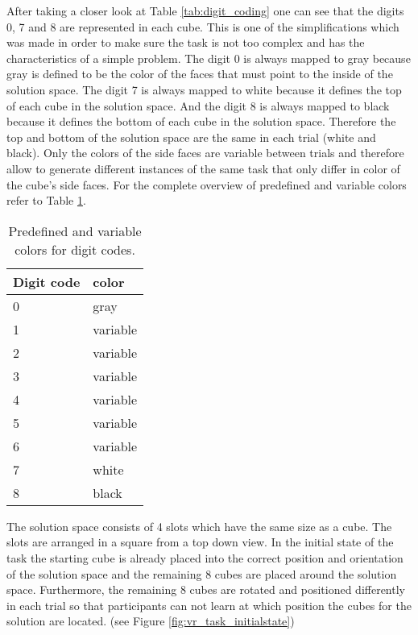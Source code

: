 After taking a closer look at Table \ref{tab:digit_coding} one can see that the digits 0, 7 and 8 are represented in each cube. This is one of the simplifications which was made in order to make sure the task is not too complex and has the characteristics of a simple problem. The digit 0 is always mapped to gray because gray is defined to be the color of the faces that must point to the inside of the solution space. The digit 7 is always mapped to white because it defines the top of each cube in the solution space. And the digit 8 is always mapped to black because it defines the bottom of each cube in the solution space. Therefore the top and bottom of the solution space are the same in each trial (white and black). Only the colors of the side faces are variable between trials and therefore allow to generate different instances of the same task that only differ in color of the cube's side faces. For the complete overview of predefined and variable colors refer to Table \ref{tab:color_mapping}.

\begin{table}
\begin{center}
    \begin{tabular}{| l | l |}
    \hline
    \textbf{Digit code} & \textbf{color} \\ \hline
    0 & gray \\ \hline
    1 & variable \\ \hline
    2 & variable \\ \hline
    3 & variable \\ \hline
    4 & variable \\ \hline
    5 & variable \\ \hline
    6 & variable \\ \hline
    7 & white \\ \hline
    8 & black \\ \hline
    \end{tabular}
\end{center}
\caption{Predefined and variable colors for digit codes.}
\label{tab:color_mapping}
\end{table}

The solution space consists of 4 slots which have the same size as a cube. The slots are arranged in a square from a top down view. In the initial state of the task the starting cube is already placed into the correct position and orientation of the solution space and the remaining 8 cubes are placed around the solution space. Furthermore, the remaining 8 cubes are rotated and positioned differently in each trial so that participants can not learn at which position the cubes for the solution are located. (see Figure \ref{fig:vr_task_initialstate})


